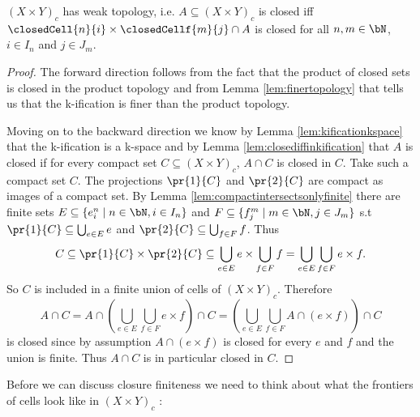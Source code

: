 \begin{lem}\label{lem:weaktopologyproduct}
    $(X \times Y)_c$ has weak topology,
    i.e. $A \subseteq (X \times Y)_c$ is closed iff $\closedCell{n}{i} \times \closedCellf{m}{j} \cap A$ is closed for all $n, m \in \bN$, $i \in I_n$ and $j \in J_m$. 
    \href{https://github.com/scholzhannah/CWComplexes/blob/7be4872a05b534011cc969eb5b80a4b7f0bf57e2/CWcomplexes/Product.lean#L322-L367}{\faExternalLink}
\end{lem}
\begin{proof}
    The forward direction follows from the fact that the product of closed sets is closed in the product topology and from Lemma \ref{lem:finertopology} that tells us that the k-ification is finer than the product topology.

    Moving on to the backward direction we know by Lemma \ref{lem:kificationkspace} that the k-ification is a k-space and by Lemma \ref{lem:closediffinkification} that $A$ is closed if for every compact set $C \subseteq (X \times Y)_c$, $A \cap C$ is closed in $C$.
    Take such a compact set $C$.
    The projections $\pr{1}{C}$ and $\pr{2}{C}$ are compact as images of a compact set. 
    By Lemma \ref{lem:compactintersectsonlyfinite} there are finite sets $E \subseteq \{e_i^n \mid n \in \bN, i \in I_n \}$ and $F \subseteq \{f_j^m \mid m \in \bN, j \in J_m \}$ s.t $\pr{1}{C} \subseteq \bigcup_{e \in E} e$ and $\pr{2}{C} \subseteq \bigcup_{f \in F} f$.
    Thus 
    \[C \subseteq \pr{1}{C} \times \pr{2}{C} \subseteq \bigcup_{e \in E} e \times \bigcup_{f \in F} f = \bigcup_{e \in E} \bigcup_{f \in F} e \times f.\] 
    So $C$ is included in a finite union of cells of $(X \times Y)_c$. 
    Therefore 
    \[A \cap C = A \cap \left (\bigcup_{e \in E} \bigcup_{f \in F} e \times f \right )\cap C = \left (\bigcup_{e \in E} \bigcup_{f \in F} A \cap (e \times f)\right ) \cap C\] 
    is closed since by assumption $A \cap (e \times f)$ is closed for every $e$ and $f$ and the union is finite. Thus $A \cap C$ is in particular closed in $C$.
\end{proof}

Before we can discuss closure finiteness we need to think about what the frontiers of cells look like in $(X \times Y)_c$ : 

